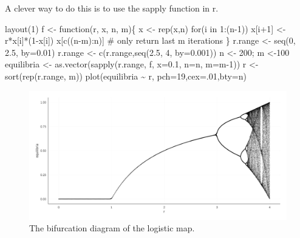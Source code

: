 \documentclass[
  a4paper,
  DIV=11,
  numbers=noendperiod]{scrreprt}
\newenvironment{Shaded}{\begin{snugshade}}{\end{snugshade}}
\newcommand{\AttributeTok}[1]{\textcolor[rgb]{0.40,0.45,0.13}{#1}}
\newcommand{\CommentTok}[1]{\textcolor[rgb]{0.37,0.37,0.37}{#1}}
\newcommand{\ControlFlowTok}[1]{\textcolor[rgb]{0.00,0.23,0.31}{#1}}
\newcommand{\DecValTok}[1]{\textcolor[rgb]{0.68,0.00,0.00}{#1}}
\newcommand{\FloatTok}[1]{\textcolor[rgb]{0.68,0.00,0.00}{#1}}
\newcommand{\FunctionTok}[1]{\textcolor[rgb]{0.28,0.35,0.67}{#1}}
\newcommand{\NormalTok}[1]{\textcolor[rgb]{0.00,0.23,0.31}{#1}}
\newcommand{\OtherTok}[1]{\textcolor[rgb]{0.00,0.23,0.31}{#1}}
\newcommand{\SpecialCharTok}[1]{\textcolor[rgb]{0.37,0.37,0.37}{#1}}
\newcommand{\StringTok}[1]{\textcolor[rgb]{0.13,0.47,0.30}{#1}}
\begin{document}
A clever way to do this is to use the sapply function in r.

\begin{Shaded}
\begin{Highlighting}[]
\FunctionTok{layout}\NormalTok{(}\DecValTok{1}\NormalTok{)}
\NormalTok{f }\OtherTok{\textless{}{-}} \ControlFlowTok{function}\NormalTok{(r, x, n, m)\{}
\NormalTok{  x }\OtherTok{\textless{}{-}} \FunctionTok{rep}\NormalTok{(x,n)}
  \ControlFlowTok{for}\NormalTok{(i }\ControlFlowTok{in} \DecValTok{1}\SpecialCharTok{:}\NormalTok{(n}\DecValTok{{-}1}\NormalTok{)) x[i}\SpecialCharTok{+}\DecValTok{1}\NormalTok{] }\OtherTok{\textless{}{-}}\NormalTok{ r}\SpecialCharTok{*}\NormalTok{x[i]}\SpecialCharTok{*}\NormalTok{(}\DecValTok{1}\SpecialCharTok{{-}}\NormalTok{x[i])}
\NormalTok{  x[}\FunctionTok{c}\NormalTok{((n}\SpecialCharTok{{-}}\NormalTok{m)}\SpecialCharTok{:}\NormalTok{n)] }\CommentTok{\# only return last m iterations}
\NormalTok{\}}
\NormalTok{r.range }\OtherTok{\textless{}{-}} \FunctionTok{seq}\NormalTok{(}\DecValTok{0}\NormalTok{, }\FloatTok{2.5}\NormalTok{, }\AttributeTok{by=}\FloatTok{0.01}\NormalTok{) }
\NormalTok{r.range }\OtherTok{\textless{}{-}} \FunctionTok{c}\NormalTok{(r.range,}\FunctionTok{seq}\NormalTok{(}\FloatTok{2.5}\NormalTok{, }\DecValTok{4}\NormalTok{, }\AttributeTok{by=}\FloatTok{0.001}\NormalTok{)) }
\NormalTok{n }\OtherTok{\textless{}{-}} \DecValTok{200}\NormalTok{; m }\OtherTok{\textless{}{-}}\DecValTok{100} 
\NormalTok{equilibria }\OtherTok{\textless{}{-}} \FunctionTok{as.vector}\NormalTok{(}\FunctionTok{sapply}\NormalTok{(r.range, f,  }\AttributeTok{x=}\FloatTok{0.1}\NormalTok{, }\AttributeTok{n=}\NormalTok{n, }\AttributeTok{m=}\NormalTok{m}\DecValTok{{-}1}\NormalTok{))}
\NormalTok{r }\OtherTok{\textless{}{-}} \FunctionTok{sort}\NormalTok{(}\FunctionTok{rep}\NormalTok{(r.range, m))}
\FunctionTok{plot}\NormalTok{(equilibria }\SpecialCharTok{\textasciitilde{}}\NormalTok{ r, }\AttributeTok{pch=}\DecValTok{19}\NormalTok{,}\AttributeTok{cex=}\NormalTok{.}\DecValTok{01}\NormalTok{,}\AttributeTok{bty=}\StringTok{\textquotesingle{}n\textquotesingle{}}\NormalTok{)}
\end{Highlighting}
\end{Shaded}

\begin{figure}

{\centering \includegraphics{media/ch2/fig-ch2-img8.jpg}

}

\caption{\label{fig-ch2-img8}The bifurcation diagram of the logistic
map.}

\end{figure}
\end{document}

